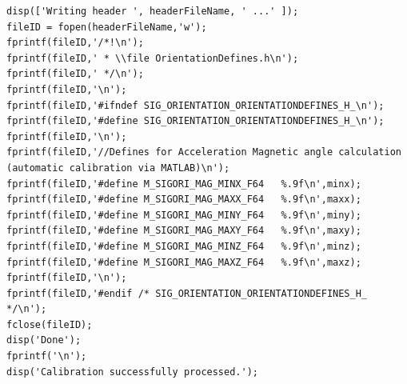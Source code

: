 \begin{lstlisting}
disp(['Writing header ', headerFileName, ' ...' ]);
fileID = fopen(headerFileName,'w');
fprintf(fileID,'/*!\n');
fprintf(fileID,' * \\file OrientationDefines.h\n');
fprintf(fileID,' */\n');
fprintf(fileID,'\n');
fprintf(fileID,'#ifndef SIG_ORIENTATION_ORIENTATIONDEFINES_H_\n');
fprintf(fileID,'#define SIG_ORIENTATION_ORIENTATIONDEFINES_H_\n');
fprintf(fileID,'\n');
fprintf(fileID,'//Defines for Acceleration Magnetic angle calculation (automatic calibration via MATLAB)\n');
fprintf(fileID,'#define M_SIGORI_MAG_MINX_F64	%.9f\n',minx);
fprintf(fileID,'#define M_SIGORI_MAG_MAXX_F64	%.9f\n',maxx);
fprintf(fileID,'#define M_SIGORI_MAG_MINY_F64	%.9f\n',miny);
fprintf(fileID,'#define M_SIGORI_MAG_MAXY_F64	%.9f\n',maxy);
fprintf(fileID,'#define M_SIGORI_MAG_MINZ_F64	%.9f\n',minz);
fprintf(fileID,'#define M_SIGORI_MAG_MAXZ_F64	%.9f\n',maxz);
fprintf(fileID,'\n');
fprintf(fileID,'#endif /* SIG_ORIENTATION_ORIENTATIONDEFINES_H_ */\n');
fclose(fileID);
disp('Done');
fprintf('\n');
disp('Calibration successfully processed.');

\end{lstlisting}



